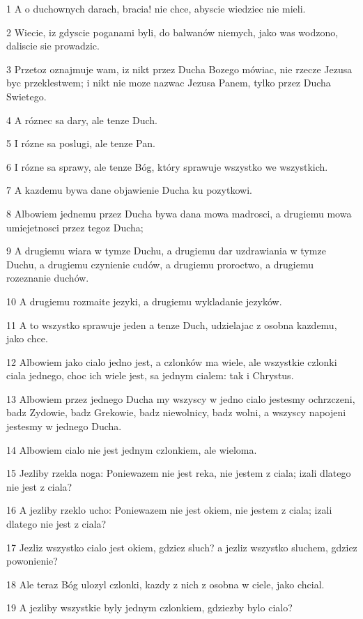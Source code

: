 \par 1 A o duchownych darach, bracia! nie chce, abyscie wiedziec nie mieli.
\par 2 Wiecie, iz gdyscie poganami byli, do balwanów niemych, jako was wodzono, daliscie sie prowadzic.
\par 3 Przetoz oznajmuje wam, iz nikt przez Ducha Bozego mówiac, nie rzecze Jezusa byc przeklestwem; i nikt nie moze nazwac Jezusa Panem, tylko przez Ducha Swietego.
\par 4 A róznec sa dary, ale tenze Duch.
\par 5 I rózne sa poslugi, ale tenze Pan.
\par 6 I rózne sa sprawy, ale tenze Bóg, który sprawuje wszystko we wszystkich.
\par 7 A kazdemu bywa dane objawienie Ducha ku pozytkowi.
\par 8 Albowiem jednemu przez Ducha bywa dana mowa madrosci, a drugiemu mowa umiejetnosci przez tegoz Ducha;
\par 9 A drugiemu wiara w tymze Duchu, a drugiemu dar uzdrawiania w tymze Duchu, a drugiemu czynienie cudów, a drugiemu proroctwo, a drugiemu rozeznanie duchów.
\par 10 A drugiemu rozmaite jezyki, a drugiemu wykladanie jezyków.
\par 11 A to wszystko sprawuje jeden a tenze Duch, udzielajac z osobna kazdemu, jako chce.
\par 12 Albowiem jako cialo jedno jest, a czlonków ma wiele, ale wszystkie czlonki ciala jednego, choc ich wiele jest, sa jednym cialem: tak i Chrystus.
\par 13 Albowiem przez jednego Ducha my wszyscy w jedno cialo jestesmy ochrzczeni, badz Zydowie, badz Grekowie, badz niewolnicy, badz wolni, a wszyscy napojeni jestesmy w jednego Ducha.
\par 14 Albowiem cialo nie jest jednym czlonkiem, ale wieloma.
\par 15 Jezliby rzekla noga: Poniewazem nie jest reka, nie jestem z ciala; izali dlatego nie jest z ciala?
\par 16 A jezliby rzeklo ucho: Poniewazem nie jest okiem, nie jestem z ciala; izali dlatego nie jest z ciala?
\par 17 Jezliz wszystko cialo jest okiem, gdziez sluch? a jezliz wszystko sluchem, gdziez powonienie?
\par 18 Ale teraz Bóg ulozyl czlonki, kazdy z nich z osobna w ciele, jako chcial.
\par 19 A jezliby wszystkie byly jednym czlonkiem, gdziezby bylo cialo?
